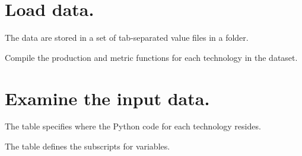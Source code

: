 \documentclass[letterpaper,10pt,english]{sphinxmanual}
\begin{document}
\section{Load data.}
\label{\detokenize{doc-src/ioc-1:load-data}}
The data are stored in a set of tab-separated value files in a folder.

\begin{sphinxVerbatim}[commandchars=\\\{\}]
  
\end{sphinxVerbatim}

\begin{sphinxVerbatim}[commandchars=\\\{\}]
  
\end{sphinxVerbatim}

Compile the production and metric functions for each technology in the dataset.

\begin{sphinxVerbatim}[commandchars=\\\{\}]
\end{sphinxVerbatim}


\section{Examine the input data.}
\label{\detokenize{doc-src/ioc-1:examine-the-input-data}}
The  table specifies where the Python code for each technology resides.

\begin{sphinxVerbatim}[commandchars=\\\{\}]
\end{sphinxVerbatim}



The  table defines the subscripts for variables.

\begin{sphinxVerbatim}[commandchars=\\\{\}]
   
\end{sphinxVerbatim}
\end{document}
